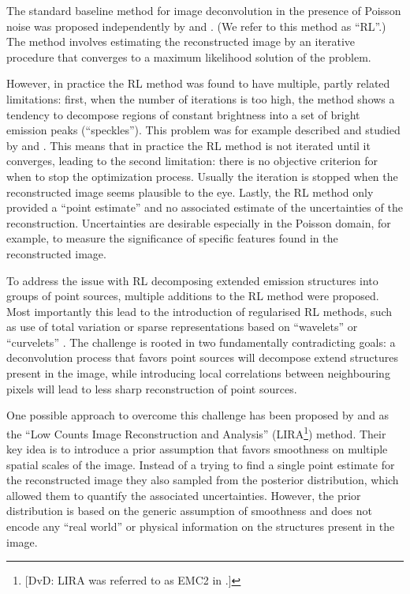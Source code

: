 \documentclass[twocolumn]{aastex631}
\newcommand{\dvd}[1]{{\color{red} [DvD: #1]}}
\begin{document}
    The standard baseline method for image deconvolution in the presence of Poisson noise was proposed independently by \cite{Richardson1972} and \cite{Lucy1974}. (We refer to this method as \enquote{RL}.) The method involves estimating the reconstructed image by an iterative procedure that converges to a maximum likelihood solution of the problem.
    
    However, in practice the RL method was found to have multiple, partly related limitations: first, when the number of iterations is too high, the method shows a tendency to decompose regions of constant brightness into a set of bright emission peaks (\enquote{speckles}). This problem was for example described and studied by \cite{Reeves1995} and \cite{Fish1995}. This means that in practice the RL method is not iterated until it converges, leading to the second limitation: there is no objective criterion for when to stop the optimization process. Usually the iteration is stopped when the reconstructed image seems plausible to the eye. 
    Lastly, the RL method only provided a \enquote{point estimate} and no associated estimate of the uncertainties of the reconstruction. Uncertainties are desirable especially in the Poisson domain, for example, to measure the significance of specific features found in the reconstructed image.
    
    To address the issue with RL decomposing extended emission structures into groups of point sources, multiple additions to the RL method were proposed. Most importantly this lead to the introduction of regularised RL methods, such as use of total variation \citep{Dey2006} or sparse representations based on \enquote{wavelets} or \enquote{curvelets} \citep{Starck2003}. The challenge is rooted in two fundamentally contradicting goals: a deconvolution process that favors point sources will decompose extend structures present in the image, while introducing local correlations between neighbouring pixels will lead to less sharp reconstruction of point sources.

    One possible approach to overcome this challenge has been proposed by \cite{Esch2004} and \cite{Connors2011} as the \enquote{Low Counts Image Reconstruction and Analysis} (LIRA\footnote{\dvd{LIRA was referred to as EMC2 in \cite{Esch2004}.}}) method. Their key idea is to introduce a prior assumption that favors smoothness on multiple spatial scales of the image. Instead of a trying to find a single point estimate for the reconstructed image they also sampled from the posterior distribution, which allowed them to quantify the associated uncertainties. However, the prior distribution is based on the generic assumption of smoothness and does not encode any \enquote{real world} or physical information on the structures present in the image.
\end{document}
